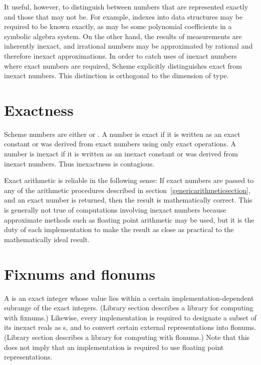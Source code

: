 It useful, however, to distinguish between numbers that are
represented exactly and those that may not be.  For example, indexes
into data structures may be required to be known exactly, as may be some polynomial
coefficients in a symbolic algebra system.  On the other hand, the
results of measurements are inherently inexact, and irrational numbers
may be approximated by rational and therefore inexact approximations.
In order to catch uses of inexact numbers where exact numbers are
required, Scheme explicitly distinguishes exact from inexact numbers.
This distinction is orthogonal to the dimension of type.

\section{Exactness}
\label{exactly}

 Scheme numbers are either  or
.  A number is exact if it is written as an exact
constant or was derived from exact numbers using only exact
operations.  A number is inexact if it is written as an inexact
constant or was derived from inexact numbers.  Thus inexactness is
contagious.  

Exact arithmetic is reliable in the following sense:
If exact numbers are passed to any of the arithmetic procedures
described in section~\ref{genericarithmeticsection}, and an
exact number is returned, then the result is mathematically
correct.
This is generally not true of
computations involving inexact numbers because approximate methods
such as floating point arithmetic may be used, but it is the duty of
each implementation to make the result as close as practical to the
mathematically ideal result.

\section{Fixnums and flonums}

A  is an exact integer whose value lies
within a certain implementation-dependent subrange of the
exact integers. (Library section  describes a
library for computing with fixnums.)
Likewise, every implementation is required
to designate a subset of its inexact reals as s, and
to convert certain external representations into flonums.  
(Library section  describes a library for
computing with flonums.)  Note that
this does not imply that an implementation is required to use
floating point representations.

